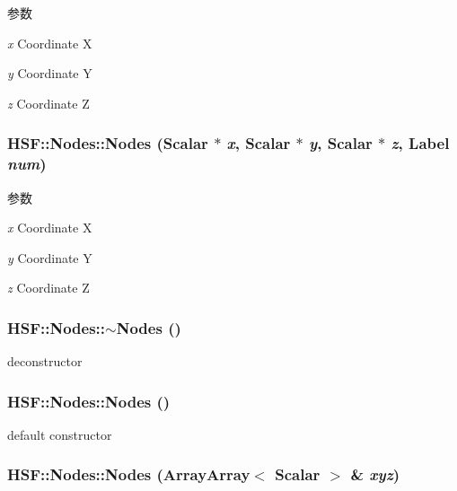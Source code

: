 \begin{DoxyParams}{参数}
\item[{\em x}]Coordinate X \item[{\em y}]Coordinate Y \item[{\em z}]Coordinate Z \end{DoxyParams}
\hypertarget{classHSF_1_1Nodes_a545e2813acfe02611c3ef8d659c8ce2f}{
\subsubsection[{Nodes}]{\setlength{\rightskip}{0pt plus 5cm}HSF::Nodes::Nodes ({\bf Scalar} $\ast$ {\em x}, \/  {\bf Scalar} $\ast$ {\em y}, \/  {\bf Scalar} $\ast$ {\em z}, \/  {\bf Label} {\em num})}}
\label{classHSF_1_1Nodes_a545e2813acfe02611c3ef8d659c8ce2f}

\begin{DoxyParams}{参数}
\item[{\em x}]Coordinate X \item[{\em y}]Coordinate Y \item[{\em z}]Coordinate Z \end{DoxyParams}
\hypertarget{classHSF_1_1Nodes_aad6cecbfe88532697dedfca221638d89}{
\subsubsection[{$\sim$Nodes}]{\setlength{\rightskip}{0pt plus 5cm}HSF::Nodes::$\sim$Nodes ()}}
\label{classHSF_1_1Nodes_aad6cecbfe88532697dedfca221638d89}


deconstructor \hypertarget{classHSF_1_1Nodes_a4cf0a36ef0cbd1d2183e6f426289b3ef}{
\subsubsection[{Nodes}]{\setlength{\rightskip}{0pt plus 5cm}HSF::Nodes::Nodes ()}}
\label{classHSF_1_1Nodes_a4cf0a36ef0cbd1d2183e6f426289b3ef}


default constructor \hypertarget{classHSF_1_1Nodes_a6c4e1453888f5fa3008d992d1f19c1b4}{
\subsubsection[{Nodes}]{\setlength{\rightskip}{0pt plus 5cm}HSF::Nodes::Nodes ({\bf ArrayArray}$<$ {\bf Scalar} $>$ \& {\em xyz})}}
\label{classHSF_1_1Nodes_a6c4e1453888f5fa3008d992d1f19c1b4}

